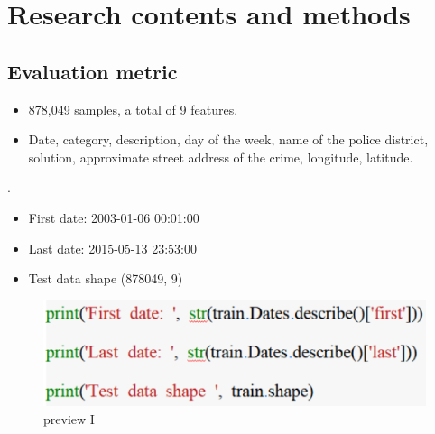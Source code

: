 \documentclass{amsart}
\begin{document}
\newpage
\section{Research contents and methods}

\subsection{Evaluation metric}
	\begin{itemize}
		\item 878,049 samples, a total of 9 features.
	\end{itemize}
	\begin{itemize}
	\item Date, category, description, day of the week, name of the police district, solution, approximate street address of the crime, longitude, latitude.
	\end{itemize}

	.\\

	\begin{itemize}
	\item First date:  2003-01-06 00:01:00
	\end{itemize}
	\begin{itemize}
	\item Last date:  2015-05-13 23:53:00
	\end{itemize}
	\begin{itemize}
	\item Test data shape  (878049, 9)
	\end{itemize}

	
	\begin{center}
		\begin{figure}[htbp]
			\includegraphics[scale=0.6]{./pic/qmcode1.eps}
			\caption{preview I}
		\end{figure}
	\end{center}
\end{document}
